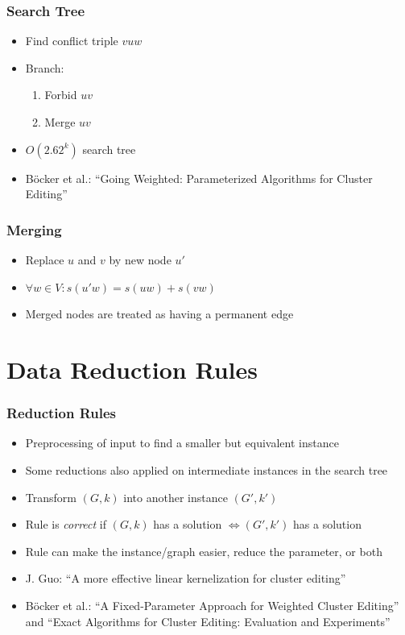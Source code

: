\documentclass{beamer}
\begin{document}
\begin{frame}
	\frametitle{Search Tree}
	\begin{itemize}
		\item Find conflict triple $vuw$
		\item Branch:
			\begin{enumerate}
				\item Forbid $uv$
				\item Merge $uv$
			\end{enumerate}
		\item $O(2.62^k)$ search tree
	\end{itemize}

	\vskip 20pt
	
	\begin{itemize}
		\item Böcker et al.: ``Going Weighted: Parameterized Algorithms for Cluster Editing''
	\end{itemize}
\end{frame}

\begin{frame}
	\frametitle{Merging}
	\begin{itemize}
		\item Replace $u$ and $v$ by new node $u'$
		\item $\forall w \in V: s(u'w) = s(uw) + s(vw)$
		\item Merged nodes are treated as having a permanent edge
	\end{itemize}
\end{frame}

\section{Data Reduction Rules}

\begin{frame}
	\frametitle{Reduction Rules}
	\begin{itemize}
		\item Preprocessing of input to find a smaller but equivalent instance
		\item Some reductions also applied on intermediate instances in the search tree
		\item Transform $(G, k)$ into another instance $(G', k')$
		\item Rule is \emph{correct} if $(G, k)$ has a solution $\Leftrightarrow (G', k')$ has a
			solution
		\item Rule can make the instance/graph easier, reduce the parameter, or both

		\vskip 10pt

		\item J. Guo: ``A more effective linear kernelization for cluster editing''
		\item Böcker et al.: ``A Fixed-Parameter Approach for Weighted Cluster Editing'' and ``Exact
			Algorithms for Cluster Editing: Evaluation and Experiments''
	\end{itemize}
\end{frame}
\end{document}
